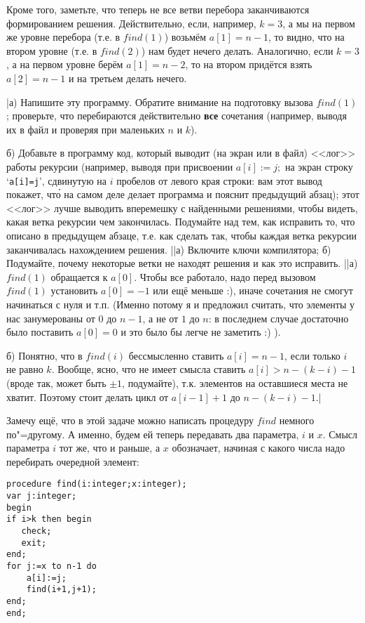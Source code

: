 Кроме того, заметьте, что теперь не все ветви перебора заканчиваются 
формированием решения. Действительно, если, например, $k=3$, а мы на первом же 
уровне перебора (т.е. в $find(1)$) возьмём $a[1]=n-1$, то видно, что на втором уровне 
(т.е. в $find(2)$) нам будет нечего делать. Аналогично, если $k=3$, а на первом 
уровне берём $a[1]=n-2$, то на втором придётся взять $a[2]=n-1$ и на третьем делать 
нечего.

\task|а) Напишите эту программу. Обратите внимание на подготовку вызова
   $find(1)$; проверьте, что перебираются действительно \textbf{все} сочетания (например, 
   выводя их в файл и проверяя при маленьких $n$ и $k$). \par
 б) Добавьте в программу код, который выводит (на экран или в файл) <<лог>> работы 
   рекурсии (например, выводя при присвоении $a[i]:=j;$ на экран строку `\texttt{a[i]=j}',
   сдвинутую на $i$ пробелов от левого края строки: вам этот вывод покажет, чт\'{о} на
   самом деле делает программа и пояснит предыдущий абзац); этот <<лог>> лучше
   выводить вперемешку с найденными решениями, чтобы видеть, какая ветка рекурсии
   чем закончилась. Подумайте над тем, как  исправить то, что описано в предыдущем
   абзаце, т.е. как сделать так, чтобы каждая ветка рекурсии заканчивалась нахождением решения.
||а) Включите ключи компилятора; б) Подумайте, почему некоторые ветки не находят решения и как это 
исправить.
||а) $find(1)$ обращается к $a[0]$. Чтобы все работало, надо перед вызовом $find(1)$ установить 
$a[0]=-1$ или ещё меньше :), иначе сочетания не смогут начинаться с нуля и т.п.
(Именно потому я и предложил считать, что элементы у нас занумерованы от $0$ до $n-1$, а не от $1$ 
до $n$: в последнем случае достаточно было поставить $a[0]=0$ и это было бы легче не заметить :) ). 
\par
б) Понятно, что в $find(i)$ бессмысленно ставить $a[i]=n-1$, если только $i$ не равно $k$. Вообще, ясно, 
что не имеет смысла ставить $a[i]>n-(k-i)-1$ (вроде так, может быть $\pm1$, подумайте), т.к. 
элементов на оставшиеся места не хватит. Поэтому стоит делать цикл от $a[i-1]+1$ до $n-(k-i)-1$.|

Замечу ещё, что в этой задаче можно написать процедуру $find$ немного по"=другому. 
А именно, будем ей теперь передавать два параметра, $i$ и $x$. Смысл параметра $i$ 
тот же, что и раньше, а $x$ обозначает, начиная с какого числа надо перебирать 
очередной элемент:

\begin{codesampleo}\begin{verbatim}
procedure find(i:integer;x:integer);
var j:integer;
begin
if i>k then begin
   check;
   exit;
end;
for j:=x to n-1 do
    a[i]:=j;
    find(i+1,j+1);
end;
end;
\end{verbatim}
\end{codesampleo}

